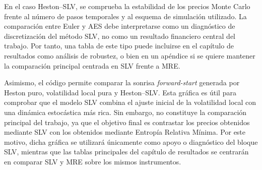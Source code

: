 En el caso Heston--SLV, se comprueba la estabilidad de los precios Monte Carlo frente al número de pasos temporales y al esquema de simulación utilizado. La comparación entre Euler y AES debe interpretarse como un diagnóstico de discretización del método SLV, no como un resultado financiero central del trabajo. Por tanto, una tabla de este tipo puede incluirse en el capítulo de resultados como análisis de robustez, o bien en un apéndice si se quiere mantener la comparación principal centrada en SLV frente a MRE.\medskip

Asimismo, el código permite comparar la sonrisa \textit{forward-start} generada por Heston puro, volatilidad local pura y Heston--SLV. Esta gráfica es útil para comprobar que el modelo SLV combina el ajuste inicial de la volatilidad local con una dinámica estocástica más rica. Sin embargo, no constituye la comparación principal del trabajo, ya que el objetivo final es contrastar los precios obtenidos mediante SLV con los obtenidos mediante Entropía Relativa Mínima. Por este motivo, dicha gráfica se utilizará únicamente como apoyo o diagnóstico del bloque SLV, mientras que las tablas principales del capítulo de resultados se centrarán en comparar SLV y MRE sobre los mismos instrumentos.
